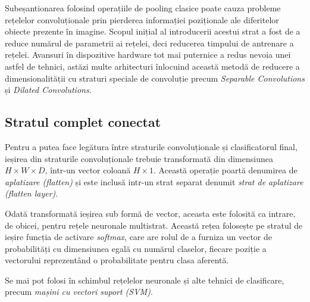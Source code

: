 Subeșantionarea folosind operațiile de pooling clasice poate cauza probleme rețelelor convoluționale prin pierderea informației poziționale ale diferitelor obiecte prezente în imagine. Scopul inițial al introducerii acestui strat a fost de a reduce numărul de parametrii ai rețelei, deci reducerea timpului de antrenare a rețelei. Avansuri în dispozitive hardware tot mai puternice a redus nevoia unei astfel de tehnici, astăzi multe arhitecturi înlocuind această metodă de reducere a dimensionalității cu straturi speciale de convoluție precum \textit{Separable Convolutions} și \textit{Dilated Convolutions}.

\subsection*{Stratul complet conectat}\label{subch:strat-complet-con}
Pentru a putea face legătura între straturile convoluționale și clasificatorul final, ieșirea din straturile convoluționale trebuie transformată din dimensiunea $H\times W\times D$, într-un vector coloană $H\times1$. Această operație poartă denumirea de \textit{aplatizare (flatten)} și este inclusă intr-un strat separat denumit \textit{strat de aplatizare (flatten layer)}.

Odată transformată ieșirea sub formă de vector, aceasta este folosită ca intrare, de obicei, pentru rețele neuronale multistrat. Această rețea folosește pe stratul de ieșire funcția de activare \textit{softmax}, care are rolul de a furniza un vector de probabilități cu dimensiunea egală cu numărul claselor, fiecare poziție a vectorului reprezentând o probabilitate pentru clasa aferentă.

Se mai pot folosi în schimbul rețelelor neuronale și alte tehnici de clasificare, precum \textit{mașini cu vectori suport (SVM)}.

